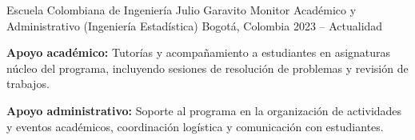 \begin{cventries}
  \vspace{0.6em}

  \cventry
    {Escuela Colombiana de Ingeniería Julio Garavito} %
    {Monitor Académico y Administrativo (Ingeniería Estadística)} %
    {Bogotá, Colombia} %
    {2023 -- Actualidad} %
    {
      \begin{cvitems}
        \item {\textbf{Apoyo académico:} Tutorías y acompañamiento a estudiantes en asignaturas núcleo del programa, incluyendo sesiones de resolución de problemas y revisión de trabajos.}
        \item {\textbf{Apoyo administrativo:} Soporte al programa en la organización de actividades y eventos académicos, coordinación logística y comunicación con estudiantes.}
      \end{cvitems}
    }

\end{cventries}
